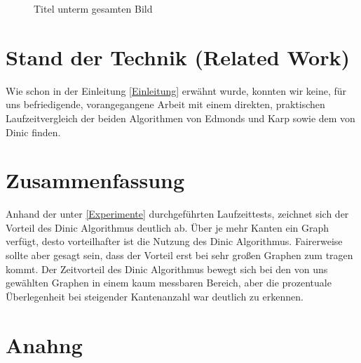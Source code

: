 \documentclass[a4paper]{llncs}
\begin{document}
\begin{figure}[H]
\label{fig:testgraph3}
\caption{Titel unterm gesamten Bild} 
\end{figure}


\section{Stand der Technik (Related Work)}
\label{Related Work}
Wie schon in der Einleitung \ref{Einleitung} erwähnt wurde, konnten wir keine, für uns befriedigende, vorangegangene Arbeit mit einem direkten, praktischen Laufzeitvergleich der beiden Algorithmen von Edmonds und Karp sowie dem von Dinic finden.

\section{Zusammenfassung}
\label{Zusammenfassung}
Anhand der unter \ref{Experimente} durchgeführten Laufzeittests, zeichnet sich der Vorteil des Dinic Algorithmus deutlich ab. Über je mehr Kanten ein Graph verfügt, desto vorteilhafter ist die Nutzung des Dinic Algorithmus. Fairerweise sollte aber gesagt sein, dass der Vorteil erst bei sehr großen Graphen zum tragen kommt. Der Zeitvorteil des Dinic Algorithmus bewegt sich bei den von uns gewählten Graphen in einem kaum messbaren Bereich, aber die prozentuale Überlegenheit bei steigender Kantenanzahl war deutlich zu erkennen.  
\section{Anahng}



 
\end{document}
